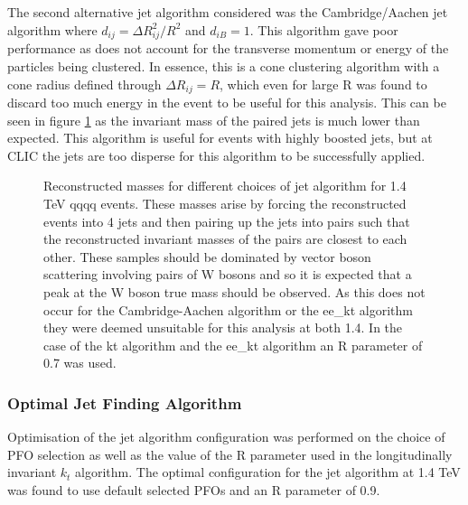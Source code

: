 The second alternative jet algorithm considered was the Cambridge/Aachen jet algorithm where $d_{ij} = {\Delta}R_{ij}^{2}/R^2$ and $d_{iB} = 1$.  This algorithm gave poor performance as does not account for the transverse momentum or energy of the particles being clustered. In essence, this is a cone clustering algorithm with a cone radius defined through ${\Delta}R_{ij} = R$, which even for large R was found to discard too much energy in the event to be useful for this analysis.  This can be seen in figure \ref{fig:invariantmassalgoveto} as the invariant mass of the paired jets is much lower than expected.  This algorithm is useful for events with highly boosted jets, but at CLIC the jets are too disperse for this algorithm to be successfully applied.

\begin{figure}
\centering
{}
\caption[Reconstructed invariant masses for different choices of jet algorithm for 1.4 TeV \nu{\nu}qqqq events.]{Reconstructed masses for different choices of jet algorithm for 1.4 TeV \nu{\nu}qqqq events. These masses arise by forcing the reconstructed events into 4 jets and then pairing up the jets into pairs such that the reconstructed invariant masses of the pairs are closest to each other. These samples should be dominated by vector boson scattering involving pairs of W bosons and so it is expected that a peak at the W boson true mass should be observed. As this does not occur for the Cambridge-Aachen algorithm or the ee\_kt algorithm they were deemed unsuitable for this analysis at both 1.4. In the case of the kt algorithm and the ee\_kt algorithm an R parameter of 0.7 was used.}
\label{fig:invariantmassalgoveto}
\end{figure}


\subsubsection{Optimal Jet Finding Algorithm}
Optimisation of the jet algorithm configuration was performed on the choice of PFO selection as well as the value of the R parameter used in the longitudinally invariant $k_{t}$ algorithm.   The optimal configuration for the jet algorithm at 1.4 TeV was found to use default selected PFOs and an R parameter of 0.9.


